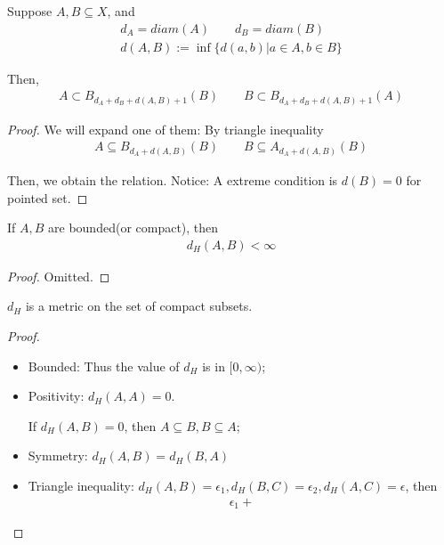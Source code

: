 \documentclass[Total.tex]{subfiles}
\begin{document}
			\begin{lemma}
				Suppose $A,B\subseteq X$, and
				\begin{gather*}
					d_A=diam(A)\qquad d_B=diam(B)\\
					d(A,B):=\inf\{d(a,b)|a\in A,b\in B\}
				\end{gather*}
				
				Then,
				\begin{gather*}
					A\subset B_{d_A+d_B+d(A,B)+1}(B)\qquad 
					B\subset B_{d_A+d_B+d(A,B)+1}(A)
				\end{gather*}
			\end{lemma}
			\begin{proof}
				We will expand one of them: By triangle inequality
				\begin{gather*}
					A\subseteq B_{d_A+d(A,B)}(B)\qquad B\subseteq A_{d_A+d(A,B)}(B)
				\end{gather*}
				
				Then, we obtain the relation. Notice: A extreme condition is $d(B)=0$ for pointed set.
			\end{proof}
			
			\begin{corollary} If $A,B$ are bounded(or compact), then
				\begin{gather*}
					d_H(A,B)<\infty
				\end{gather*}
			\end{corollary}
			\begin{proof}
				Omitted.
			\end{proof}
			
			\begin{proposition}
				$d_H$ is a metric on the set of compact subsets.
			\end{proposition}
			\begin{proof}
				\begin{itemize}
					\item Bounded: Thus the value of $d_H$ is in $[0,\infty)$;
					\item Positivity: $d_H(A,A)=0$.
					
					If $d_H(A,B)=0$, then $A\subseteq B,B\subseteq A$;
					\item Symmetry: $d_H(A,B)=d_H(B,A)$
					\item Triangle inequality: $d_H(A,B)=\epsilon_1,d_H(B,C)=\epsilon_2,d_H(A,C)=\epsilon$, then
					\begin{gather*}
						\epsilon_1+
					\end{gather*}
				\end{itemize}
			\end{proof}
			
\end{document}
